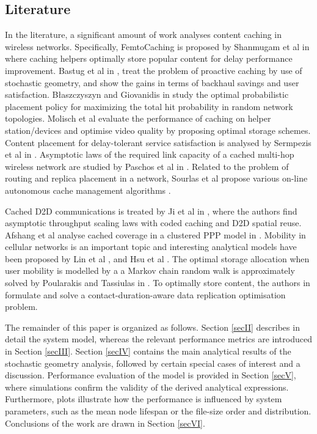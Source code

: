 \documentclass[conference]{IEEEtran}
\begin{document}
\subsection{Literature}

In the literature, a significant amount of work analyses content caching in wireless networks. Specifically, FemtoCaching is proposed by Shanmugam et al in \cite{shanmugam2013femtocaching} where caching helpers optimally store popular content for delay performance improvement. Bastug et al in \cite{bastug2014living}, treat the problem of proactive caching by use of stochastic geometry, and show the gains in terms of backhaul savings and user satisfaction. B{\l}aszczyszyn and Giovanidis in \cite{BlaGioICC15} study the optimal probabilistic placement policy for maximizing the total hit probability in random network topologies. Molisch et al \cite{molisch2014caching} evaluate the performance of caching on helper station/devices and optimise video quality by proposing optimal storage schemes. Content placement for delay-tolerant service satisfaction is analysed by Sermpezis et al in \cite{SeSpy15}. Asymptotic laws of the required link capacity of a cached multi-hop wireless network are studied by Paschos et al in \cite{PaschWIOPT12}. Related to the problem of routing and replica placement in a network, Sourlas et al propose various on-line autonomous cache management algorithms \cite{SourlasAlgoN13}.

Cached D2D communications is treated by Ji et al in \cite{ji2013fundamental}, where the authors find asymptotic throughput scaling laws with coded caching and D2D spatial reuse. Afshang et al analyse cached coverage in a clustered PPP model in \cite{ADhill15b}. Mobility in cellular networks is an important topic and interesting analytical models have been proposed by Lin et al \cite{GantiMob13}, and Hsu et al \cite{Hsu09}. The optimal storage allocation when user mobility is modelled by a a Markov chain random walk is approximately solved by Poularakis and Tassiulas in \cite{poularakis2013exploiting}. To optimally store content, the authors in \cite{ZhuoCont11} formulate and solve a contact-duration-aware data replication optimisation problem.



The remainder of this paper is organized as follows. Section \ref{secII} describes in detail the system model, whereas the relevant performance metrics are introduced in Section \ref{secIII}. Section \ref{secIV} contains the main analytical results of the stochastic geometry analysis, followed by certain special cases of interest and a discussion. Performance evaluation of the model is provided in Section \ref{secV}, where simulations confirm the validity of the derived analytical expressions. Furthermore, plots illustrate how the performance is influenced by system parameters, such as the mean node lifespan or the file-size order and distribution. Conclusions of the work are drawn in Section \ref{secVI}.
\end{document}
